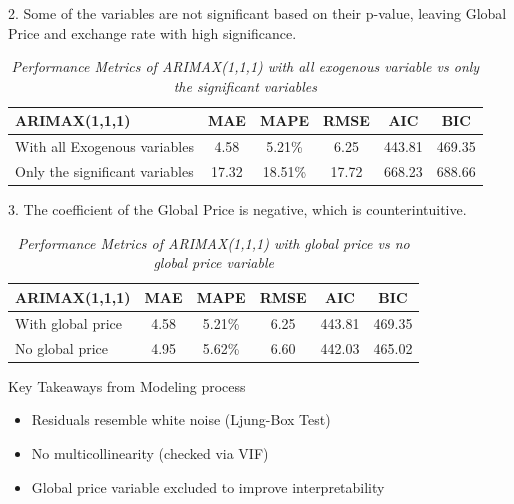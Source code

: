 \documentclass[12pt, aspectratio=169]{beamer}
\begin{document}
\begin{frame}{2. Some of the variables are not significant based on their p-value, leaving Global Price and exchange rate with high significance.}
    
      \begin{table}[H]
        \caption{\textit{Performance Metrics of ARIMAX(1,1,1) with all exogenous variable vs only the significant variables}}
        \label{exog_significant}
        \centering
        \begin{tabular}{lccccc}
            \toprule
            ARIMAX(1,1,1) & MAE & MAPE & RMSE & AIC & BIC \\
            \midrule
            With all Exogenous variables & 4.58 & 5.21\% & 6.25 & 443.81 & 469.35 \\
            Only the significant variables & 17.32 & 18.51\% & 17.72 & 668.23 & 688.66 \\
            \bottomrule
        \end{tabular}
    \end{table}
\end{frame}

\begin{frame}{3. The coefficient of the Global Price is negative, which is counterintuitive.}
           \begin{table}[H]
        \caption{\textit{Performance Metrics of ARIMAX(1,1,1) with global price vs no global price variable}}
        \label{noglobal}
        \centering
        \begin{tabular}{lccccc}
            \toprule
            ARIMAX(1,1,1) & MAE & MAPE & RMSE & AIC & BIC \\
            \midrule
            With global price & 4.58 & 5.21\% & 6.25 & 443.81 & 469.35 \\
            No global price  & 4.95 & 5.62\% & 6.60 & 442.03 & 465.02 \\
            \bottomrule
        \end{tabular}
    \end{table}
\end{frame}

\begin{frame}{Key Takeaways from Modeling process}
  \begin{itemize}
    \item Residuals resemble white noise (Ljung-Box Test)
    \item No multicollinearity (checked via VIF)
    \item Global price variable excluded to improve interpretability
  \end{itemize}
\end{frame}
\end{document}
